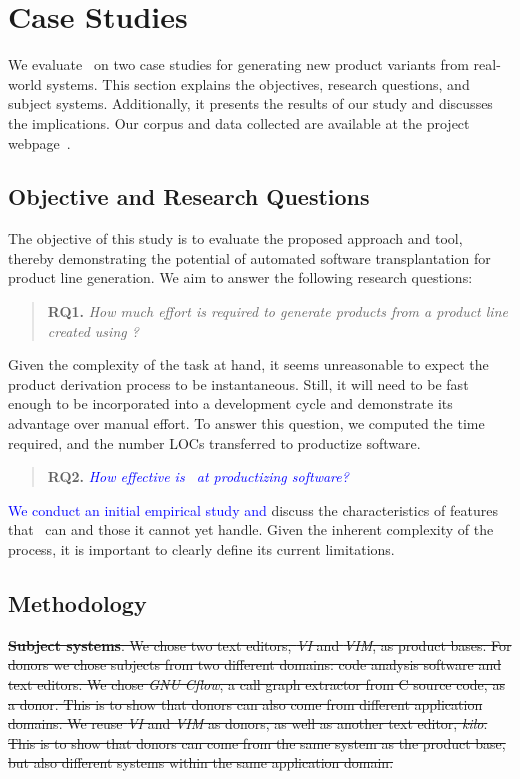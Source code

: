 \section{Case Studies} \label{sec:case_studies}
We evaluate \prodscalpel~on two case studies for generating new product variants from real-world systems. This section explains the objectives, research questions, and subject systems. Additionally, it presents the results of our study and discusses the implications. Our corpus and data collected are available at the project webpage~\cite{ProjectWebpage}.

\subsection{Objective and Research Questions}
The objective of this study is to evaluate the proposed approach and tool, thereby demonstrating the potential of automated software transplantation for product line generation. %
We aim to answer the following research questions:

\begin{quote}
\textbf{RQ1.} \emph{How much effort is required to generate products from a product line created using \prodscalpel?}
\end{quote}
Given the complexity of the task at hand, it seems unreasonable to expect the product derivation process to be instantaneous. Still, it will need to be fast enough to be incorporated into a development cycle and demonstrate its advantage over manual effort. To answer this question, we computed the time required, and the number LOCs transferred to productize software.

\begin{quote}
\textbf{RQ2.} \emph{\textcolor{blue}{How effective is \prodscalpel~at productizing software?}}
\end{quote}
\textcolor{blue}{We conduct an initial empirical study and} discuss the characteristics of features that \prodscalpel~can and those it cannot yet handle. Given the inherent complexity of the process, it is important to clearly define its current limitations. 

\subsection{Methodology}

\sout{\textbf{Subject systems}. We chose two text editors, \emph{VI} and \emph{VIM}, as product bases.
For donors we chose subjects from two different domains: code analysis software and text editors.
We chose \emph{GNU Cflow}, a call graph extractor from C source code, as a donor.
This is to show that donors can also come from different application domains.
We reuse \emph{VI} and \emph{VIM} as donors, as well as another text editor, \emph{kilo}.
This is to show that donors can come from the same system as the product base, but also different systems within the same application domain.}


